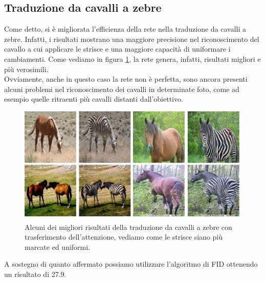 \subsection{Traduzione da cavalli a zebre}
Come detto, si è migliorata l'efficienza della rete nella traduzione da cavalli a zebre. Infatti, i risultati mostrano una maggiore precisione nel riconoscimento del cavallo a cui applicare le strisce e una maggiore capacità di uniformare i cambiamenti. Come vediamo in figura \ref{fig:Risultati Zebre CycleGan + GradCam}, la rete genera, infatti, risultati migliori e più verosimili.
\\Ovviamente, anche in questo caso la rete non è perfetta, sono ancora presenti alcuni problemi nel riconoscimento dei cavalli in determinate foto, come ad esempio quelle ritraenti più cavalli distanti dall'obiettivo.

\begin{figure}[H]
\begin{center}
\includegraphics[width=1\columnwidth]{images/CycleGan + GradCam zebre.jpeg} 
\end{center}
\caption{Alcuni dei migliori risultati della traduzione da cavalli a zebre con trasferimento dell'attenzione, vediamo come le strisce siano più marcate ed uniformi.}
\label{fig:Risultati Zebre CycleGan + GradCam}
\end{figure} 

A sostegno di quanto affermato possiamo utilizzare l'algoritmo di FID ottenendo un risultato di 27.9.

